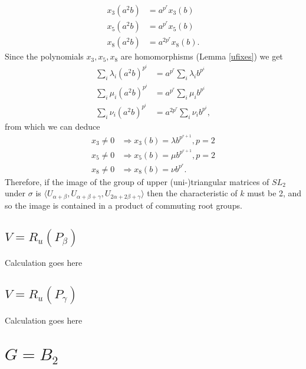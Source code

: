 	\begin{align*}
	x_3(a^2b) &= a^{p^r}x_3(b)\\
							 x_5(a^2b) &= a^{p^r}x_5(b)\\
							 x_8(a^2b) &= a^{2p^r}x_8(b).
							 \end{align*}
							 Since the polynomials $x_3, x_5, x_8$ are homomorphisms (Lemma \ref{ufixes}) we get
							 \begin{align*}
							 \sum_i \lambda_i (a^2b)^{p^i} &= a^{p^r} \sum_i \lambda_i b^{p^i}\\
								 \sum_i \mu_i (a^2b)^{p^i} &= a^{p^r} \sum_i \mu_i b^{p^i}\\
								 \sum_i \nu_i (a^2b)^{p^i} &= a^{2p^r} \sum_i \nu_i b^{p^i},
							 \end{align*}
							 from which we can deduce
							 \begin{align*}
							 x_3 \neq 0 &\Longrightarrow x_3(b) = \lambda b^{p^{r+1}}, p = 2\\
																										x_5 \neq 0 &\Longrightarrow x_5(b) = \mu b^{p^{r+1}}, p = 2\\
																										x_8 \neq 0 &\Longrightarrow x_8(b) = \nu b^{p^r}.
																										\end{align*}
																										Therefore, if the image of the group of upper (uni-)triangular matrices of $SL_2$ under $\sigma$ is $\langle U_{\alpha+\beta}, U_{\alpha+\beta+\gamma}, U_{2\alpha+2\beta+\gamma} \rangle$ then the characteristic of $k$ must be 2, and so the image is contained in a product of commuting root groups.


																										\subsection{$V = R_u(P_\beta)$}
																										\label{c3:beta}
																										Calculation goes here

																										\subsection{$V = R_u(P_\gamma)$}
																										\label{c3:gamma}
																										Calculation goes here

																										\section{$G = B_2$}
																										\label{b2}

